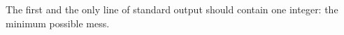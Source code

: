 The first and the only line of standard output should contain one integer: the minimum possible mess.